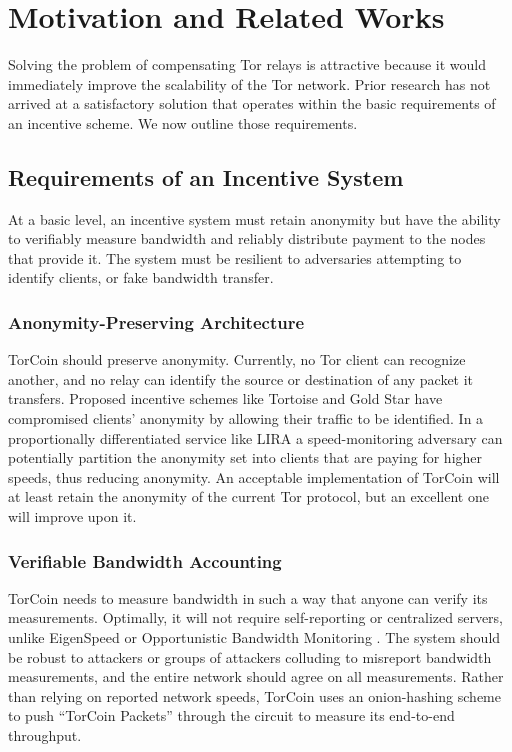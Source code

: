 \section{Motivation and Related Works} \label{motivation} Solving the problem of
compensating Tor relays is attractive because it would immediately improve the
scalability of the Tor network. Prior research has not arrived at a satisfactory
solution that operates within the basic requirements of an incentive scheme. We
now outline those requirements.

\subsection{Requirements of an Incentive System} At a basic level, an incentive
system must retain anonymity but have the ability to verifiably measure
bandwidth and reliably distribute payment to the nodes that provide it. The
system must be resilient to adversaries attempting to  identify clients, or fake
bandwidth transfer.

\subsubsection{Anonymity-Preserving Architecture} TorCoin should preserve
anonymity. Currently, no Tor client can recognize another, and no relay can
identify the source or destination of any packet it transfers. Proposed
incentive schemes like Tortoise\cite{acsac11-tortoise} and Gold Star\cite
{incentives-fc10} have compromised clients' anonymity by allowing their traffic
to be identified\cite{jansen2013lira}. In a proportionally differentiated
service \cite{blake1998architecture, dovrolis1999case} like LIRA
\cite{jansen2013lira} a speed-monitoring adversary can potentially partition the
anonymity set into clients that are paying for higher speeds, thus reducing
anonymity. An acceptable implementation of TorCoin will at least retain the
anonymity of the current Tor protocol, but an excellent one will improve upon
it.

\subsubsection{Verifiable Bandwidth Accounting} TorCoin needs to measure
bandwidth in such a way that anyone can verify its measurements. Optimally, it
will not require self-reporting or centralized servers, unlike EigenSpeed
\cite{snader2009eigenspeed} or Opportunistic Bandwidth Monitoring
\cite{snader2008tune}. The system should be robust to attackers or groups of
attackers colluding to misreport bandwidth measurements, and the entire network 
should agree on all measurements. Rather than relying on reported network
speeds, TorCoin uses an onion-hashing scheme to push ``TorCoin Packets'' through
the circuit to measure its end-to-end throughput.

